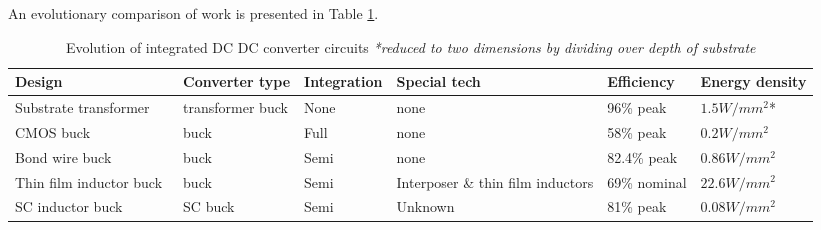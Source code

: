 \documentclass[letterpaper,twocolumn,10pt]{article}
\begin{document}
An evolutionary comparison of work is presented in Table \ref{EffnEnergyDensity}.\\
\begin{table}[t]
\centering
    \begin{tabular}{|l|l|l|l|l|l|}
    \hline
    Design                  & Converter type           & Integration & Special tech                         & Efficiency   & Energy density \\ \hline
    Substrate transformer~\cite{Gong2008}   &  transformer buck & None        & none                                 & 96\% peak    & $1.5W/mm^2$*    \\ \hline
    CMOS buck~\cite{Wens2011}               & buck                     & Full        & none                                 & 58\% peak    & $0.2W/mm^2$     \\ \hline
    Bond wire buck~\cite{ChengII2013}           & buck                     & Semi        & none                                 & 82.4\% peak  & $0.86W/mm^2$    \\ \hline
    Thin film inductor buck~\cite{Sturcken2013} & buck                     & Semi        & Interposer \& thin film inductors & 69\% nominal & $22.6W/mm^2$    \\ \hline
    SC inductor buck~\cite{Pilawa2012}        & SC buck           & Semi        & Unknown                              & 81\% peak    & $0.08W/mm^2$    \\ \hline    
    \end{tabular}
    \caption{Evolution of integrated DC DC converter circuits \textit{*reduced to two dimensions by dividing over depth of substrate}}
    \label{EffnEnergyDensity}
\end{table}
\end{document}
